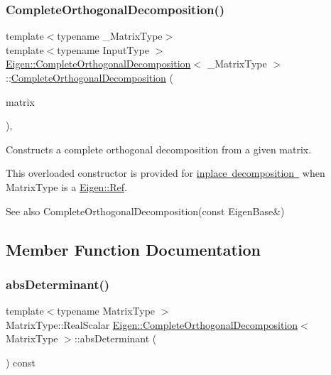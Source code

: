 \subsubsection{\texorpdfstring{CompleteOrthogonalDecomposition()}{CompleteOrthogonalDecomposition()}\hspace{0.1cm}{\footnotesize\ttfamily [4/4]}}
{\footnotesize\ttfamily template$<$typename \+\_\+\+Matrix\+Type$>$ \\
template$<$typename Input\+Type $>$ \\
\mbox{\hyperlink{class_eigen_1_1_complete_orthogonal_decomposition}{Eigen\+::\+Complete\+Orthogonal\+Decomposition}}$<$ \+\_\+\+Matrix\+Type $>$\+::\mbox{\hyperlink{class_eigen_1_1_complete_orthogonal_decomposition}{Complete\+Orthogonal\+Decomposition}} (\begin{DoxyParamCaption}\item[{\mbox{\hyperlink{struct_eigen_1_1_eigen_base}{Eigen\+Base}}$<$ Input\+Type $>$ \&}]{matrix }\end{DoxyParamCaption})\hspace{0.3cm}{\ttfamily [inline]}, {\ttfamily [explicit]}}



Constructs a complete orthogonal decomposition from a given matrix. 

This overloaded constructor is provided for \mbox{\hyperlink{}{inplace decomposition }} when {\ttfamily Matrix\+Type} is a \mbox{\hyperlink{class_eigen_1_1_ref}{Eigen\+::\+Ref}}.

\begin{DoxySeeAlso}{See also}
Complete\+Orthogonal\+Decomposition(const Eigen\+Base\&) 
\end{DoxySeeAlso}


\subsection{Member Function Documentation}
\mbox{\label{class_eigen_1_1_complete_orthogonal_decomposition_ac040c34ce3fb2b68d3f57adc0c29d526}} 
\subsubsection{\texorpdfstring{absDeterminant()}{absDeterminant()}}
{\footnotesize\ttfamily template$<$typename Matrix\+Type $>$ \\
Matrix\+Type\+::\+Real\+Scalar \mbox{\hyperlink{class_eigen_1_1_complete_orthogonal_decomposition}{Eigen\+::\+Complete\+Orthogonal\+Decomposition}}$<$ Matrix\+Type $>$\+::abs\+Determinant (\begin{DoxyParamCaption}{ }\end{DoxyParamCaption}) const}

